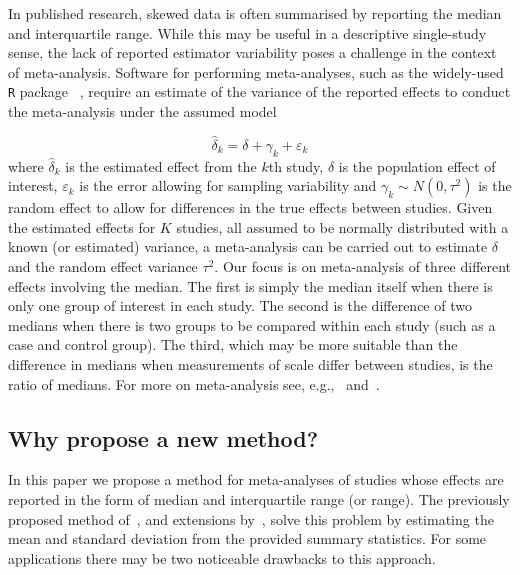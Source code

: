\documentclass{article}
\begin{document}
In published research, skewed data is often summarised by reporting the median and interquartile range. While this may be useful in a descriptive single-study sense, the lack of reported estimator variability poses a challenge in the context of meta-analysis.  Software for performing meta-analyses, such as the widely-used \texttt{R} package ~\cite{viechtbauerConductingMetaanalysesMetafor2010}, require an estimate of the variance of the reported effects to conduct the meta-analysis under the assumed model

\begin{equation}
\widehat{\delta}_k=\delta + \gamma_k + \varepsilon_k
\end{equation}
where $\widehat{\delta}_k$ is the estimated effect from the $k$th study, $\delta$ is the population effect of interest, $\varepsilon_k$ is the error allowing for sampling variability and $\gamma_k\sim N(0,\tau^2)$ is the random effect to allow for differences in the true effects between studies.  Given the estimated effects for $K$ studies, all assumed to be normally distributed with a known (or estimated) variance, a meta-analysis can be carried out to estimate $\delta$ and the random effect variance $\tau^2$.  Our focus is on meta-analysis of three different effects involving the median.  The first is simply the median itself when there is only one group of interest in each study.  The second is the difference of two medians when there is two groups to be compared within each study (such as a case and control group).  The third, which may be more suitable than the difference in medians when measurements of scale differ between studies, is the ratio of medians.   For more on meta-analysis see, e.g.,~\cite{borenstein2008introduction} and~\cite{kulinskaya2008meta}.

\subsection{Why propose a new method?}

In this paper we propose a method for meta-analyses of studies whose effects are reported in the form of median and interquartile range (or range). The previously proposed method of~\cite{hozoEstimatingMeanVariance2005}, and extensions by~\cite{blandEstimatingMeanStandard2014, wanEstimatingSampleMean2014}, solve this problem by estimating the mean and standard deviation from the provided summary statistics. For some applications there may be two noticeable drawbacks to this approach.
\end{document}
